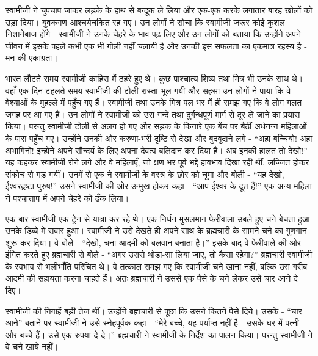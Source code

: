 स्वामीजी ने चुपचाप जाकर लड़के के हाथ से बन्दूक ले लिया और एक-एक करके लगातार बारह खोलों को उड़ा दिया। युवकगण आश्चर्यचकित रह गए। उन लोगों ने सोचा कि स्वामीजी जरूर कोई कुशल निशानेबाज होंगे। स्वामीजी ने उनके चेहरे के भाव पढ़ लिए और उन लोगों को बताया कि उन्होंने अपने जीवन में इसके पहले कभी एक भी गोली नहीं चलायी है और उनकी इस सफलता का एकमात्र रहस्य है - मन की एकाग्रता। 

\delimiter

भारत लौटते समय स्वामीजी काहिरा में ठहरे हुए थे। कुछ पाश्चात्य शिष्य तथा मित्र भी उनके साथ थे। वहाँ एक दिन टहलते समय स्वामीजी की टोली रास्ता भूल गयी और सहसा उन लोगों ने पाया कि वे वेश्याओं के मुहल्ले में पहुँच गए हैं। स्वामीजी तथा उनके मित्र पल भर में ही समझ गए कि वे लोग गलत जगह पर आ गए हैं। उन लोगों ने स्वामीजी को उस गन्दे तथा दुर्गन्धपूर्ण मार्ग से दूर ले जाने का प्रयास किया। परन्तु स्वामीजी टोली से अलग हो गए और सड़क के किनारे एक बेंच पर बैठीं अर्धनग्न महिलाओं के पास पहुँच गए। उन्होंने उनकी ओर करुणा-भरी दृष्टि से देखा और बुदबुदाने लगे - “अहा बच्चियो! अहा अभागिनो! इन्होंने अपने सौन्दर्य के लिए अपना देवत्व बलिदान कर दिया है। अब इनकी हालत तो देखो!” यह कहकर स्वामीजी रोने लगे और वे महिलाएँ, जो क्षण भर पूर्व भद्दे हावभाव दिखा रही थीं, लज्जित होकर संकोच से गड़ गयीं। उनमें से एक ने स्वामीजी के वस्त्र के छोर को चूमा और बोली - “यह देखो, ईश्वरद्रष्टा पुरुष!” उसने स्वामीजी की ओर उन्मुख होकर कहा - “आप ईश्वर के दूत हैं!” एक अन्य महिला ने पश्चात्ताप में अपने चेहरे को ढँक लिया। 

\vskip -6pt

\delimiter

एक बार स्वामीजी एक ट्रेन से यात्रा कर रहे थे। एक निर्धन मुसलमान फेरीवाला उबले हुए चने बेचता हुआ उनके डिब्बे में सवार हुआ। स्वामीजी ने उसे देखते ही अपने साथ के ब्रह्मचारी के सामने चने का गुणगान शुरू कर दिया। वे बोले - “देखो, चना आदमी को बलवान बनाता है।” इसके बाद वे फेरीवाले की ओर इंगित करते हुए ब्रह्मचारी से बोले - “अगर उससे थोड़ा-सा लिया जाए, तो कैसा रहेगा?” ब्रह्मचारी स्वामीजी के स्वभाव से भलीभाँति परिचित थे। वे तत्काल समझ गए कि स्वामीजी चने खाना नहीं, बल्कि उस गरीब आदमी की सहायता करना चाहते हैं। अतः ब्रह्मचारी ने उससे एक पैसे के चने लेकर उसे चार आने दे दिए। 

स्वामीजी की निगाहें बड़ी तेज थीं। उन्होंने ब्रह्मचारी से पूछा कि उसने कितने पैसे दिये। उसके - “चार आने” बताने पर स्वामीजी ने उसे स्नेहपूर्वक कहा - “मेरे बच्चे, यह पर्याप्त नहीं है। उसके घर में पत्नी और बच्चे हैं। उसे एक रुपया दे दे।” ब्रह्मचारी ने स्वामीजी के निर्देश का पालन किया। परन्तु स्वामीजी ने वे चने खाये नहीं। 

\vskip -6pt

